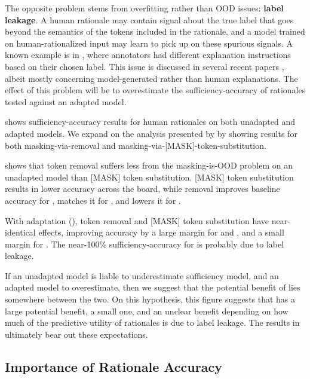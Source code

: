 The opposite problem stems from overfitting rather than OOD issues: \textbf{label leakage}. A human rationale may contain signal about the true label that goes beyond the semantics of the tokens included in the rationale, and a model trained on human-rationalized input may learn to pick up on these spurious signals. A known example is in \esnli, where annotators had different explanation instructions based on their chosen label. This issue is discussed in several recent papers \cite{yu_understanding_2021, jethani_have_2021, hase_leakage-adjusted_2020}, albeit mostly concerning model-generated rather than human explanations. The effect of this problem will be to overestimate the sufficiency-accuracy of rationales tested against an adapted model. 

 shows sufficiency-accuracy results for human rationales on both unadapted and adapted models. We expand on the analysis presented by \citet{carton_evaluating_2020} by showing results for both masking-via-removal and masking-via-[MASK]-token-substitution.

 shows that token removal suffers less from the masking-is-OOD problem on an unadapted model than [MASK] token substitution. [MASK] token substitution results in lower accuracy across the board, while removal improves baseline accuracy for \multirc, matches it for \fever, and lowers it for \esnli. 

With adaptation (), token removal and [MASK] token substitution have near-identical effects, improving accuracy by a large margin for \multirc and \esnli, and a small margin for \fever. The near-100\% sufficiency-accuracy for \esnli is probably due to label leakage. 


If an unadapted model is liable to underestimate sufficiency model, and an adapted model to overestimate, then we suggest that the potential benefit of \learningfromexplanation lies somewhere between the two. On this hypothesis, this figure suggests that \multirc has a large potential benefit, \fever a small one, and \esnli an unclear benefit depending on how much of the predictive utility of \esnli rationales is due to label leakage. The results in  ultimately bear out these expectations. 







\subsection{Importance of Rationale Accuracy}
\label{subsec:rationale-recall-analysis}



